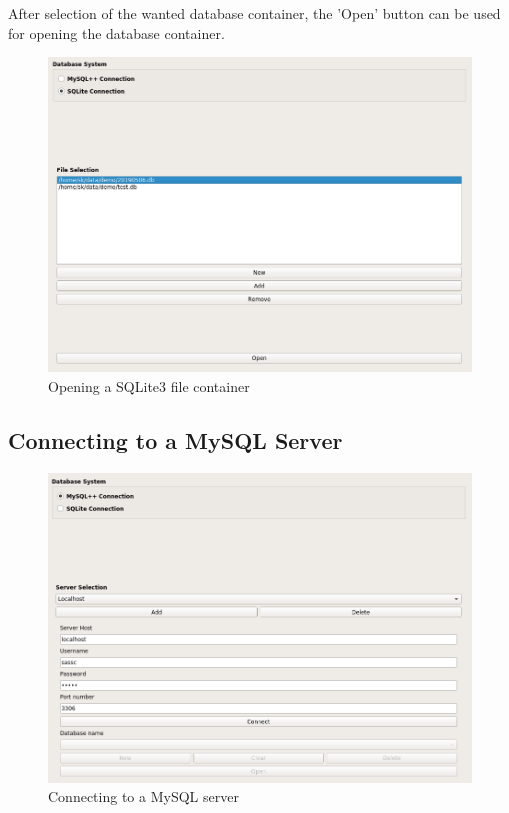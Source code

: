 After selection of the wanted database container, the 'Open' button can be used for opening the database container.

\begin{figure}[H]
  \center
    \includegraphics[width=16cm,frame]{figures/sqlite3_open.png}
  \caption{Opening a SQLite3 file container}
  \label{fig:sqlite3_open}
\end{figure} 


\subsection{Connecting to a MySQL Server}
\label{sec:mysql_connect}

\begin{figure}[H]
  \center
    \includegraphics[width=16cm,frame]{figures/mysql_server_selection.png}
  \caption{Connecting to a MySQL server}
  \label{fig:mysql_connect}
\end{figure}

